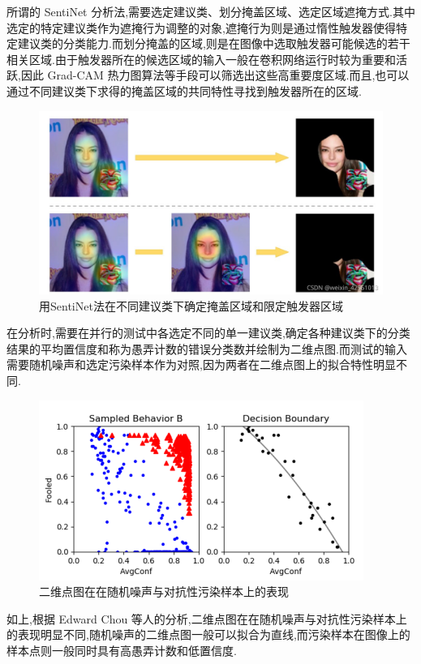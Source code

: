 \begin{enumerate}
	所谓的 SentiNet 分析法,需要选定建议类、划分掩盖区域、选定区域遮掩方式.其中选定的特定建议类作为遮掩行为调整的对象,遮掩行为则是通过惰性触发器使得特定建议类的分类能力.而划分掩盖的区域,则是在图像中选取触发器可能候选的若干相关区域.由于触发器所在的候选区域的输入一般在卷积网络运行时较为重要和活跃,因此 Grad-CAM 热力图算法等手段可以筛选出这些高重要度区域.而且,也可以通过不同建议类下求得的掩盖区域的共同特性寻找到触发器所在的区域.
	
	\begin{figure}[H]
		\centering
		\includegraphics[scale=0.3]{Figures/gradcam.jpg}
		\caption{用SentiNet法在不同建议类下确定掩盖区域和限定触发器区域}
	\end{figure}
	
	在分析时,需要在并行的测试中各选定不同的单一建议类,确定各种建议类下的分类结果的平均置信度和称为愚弄计数的错误分类数并绘制为二维点图.而测试的输入需要随机噪声和选定污染样本作为对照,因为两者在二维点图上的拟合特性明显不同.

	\begin{figure}
		\centering
		\includegraphics[scale=1.2]{Figures/sentinet2.png}
		\caption{二维点图在在随机噪声与对抗性污染样本上的表现}
	\end{figure}

	如上,根据 Edward Chou 等人的分析,二维点图在在随机噪声与对抗性污染样本上的表现明显不同,随机噪声的二维点图一般可以拟合为直线,而污染样本在图像上的样本点则一般同时具有高愚弄计数和低置信度.
	

\end{enumerate}
